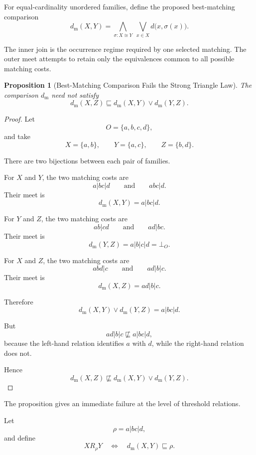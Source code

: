 \documentclass[11pt]{article}
\theoremstyle{plain}
\newtheorem{proposition}[theorem]{Proposition}
\theoremstyle{definition}
\theoremstyle{remark}
\begin{document}
For equal-cardinality unordered families,
define the proposed best-matching comparison
\[
  d_{\mathrm{m}}(X,Y)
  =
  \bigwedge_{\sigma:X\cong Y}
  \;
  \bigvee_{x\in X}
  d
  \bigl(
  x,
  \sigma(x)
  \bigr).
\]

The inner join is the occurrence regime
required by one selected matching.
The outer meet attempts to retain
only the equivalences common
to all possible matching costs.

\begin{proposition}[Best-Matching Comparison Fails the Strong Triangle Law]
  \label{ik.prop.matching-no-triangle}
  The comparison \(d_{\mathrm{m}}\)
  need not satisfy
  \[
    d_{\mathrm{m}}(X,Z)
    \sqsubseteq
    d_{\mathrm{m}}(X,Y)
    \vee
    d_{\mathrm{m}}(Y,Z).
  \]
\end{proposition}

\begin{proof}
  Let
  \[
    O
    =
    \{a,b,c,d\},
  \]
  and take
  \[
    X
    =
    \{a,b\},
    \qquad
    Y
    =
    \{a,c\},
    \qquad
    Z
    =
    \{b,d\}.
  \]

  There are two bijections
  between each pair of families.

  For \(X\) and \(Y\),
  the two matching costs are
  \[
    a|bc|d
    \qquad\text{and}\qquad
    abc|d.
  \]
  Their meet is
  \[
    d_{\mathrm{m}}(X,Y)
    =
    a|bc|d.
  \]

  For \(Y\) and \(Z\),
  the two matching costs are
  \[
    ab|cd
    \qquad\text{and}\qquad
    ad|bc.
  \]
  Their meet is
  \[
    d_{\mathrm{m}}(Y,Z)
    =
    a|b|c|d
    =
    \bot_O.
  \]

  For \(X\) and \(Z\),
  the two matching costs are
  \[
    abd|c
    \qquad\text{and}\qquad
    ad|b|c.
  \]
  Their meet is
  \[
    d_{\mathrm{m}}(X,Z)
    =
    ad|b|c.
  \]

  Therefore
  \[
    d_{\mathrm{m}}(X,Y)
    \vee
    d_{\mathrm{m}}(Y,Z)
    =
    a|bc|d.
  \]

  But
  \[
    ad|b|c
    \not\sqsubseteq
    a|bc|d,
  \]
  because the left-hand relation identifies
  \(a\) with \(d\),
  while the right-hand relation does not.

  Hence
  \[
    d_{\mathrm{m}}(X,Z)
    \not\sqsubseteq
    d_{\mathrm{m}}(X,Y)
    \vee
    d_{\mathrm{m}}(Y,Z).
  \]
\end{proof}

The proposition gives an immediate failure
at the level of threshold relations.

Let
\[
  \rho
  =
  a|bc|d,
\]
and define
\[
  X
  \mathrel{R_{\rho}}
  Y
  \quad\Longleftrightarrow\quad
  d_{\mathrm{m}}(X,Y)
  \sqsubseteq
  \rho.
\]
\end{document}
